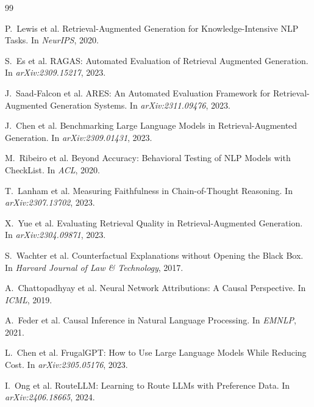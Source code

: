 \documentclass[11pt,a4paper]{article}
\begin{document}

\begin{thebibliography}{99}

P.~Lewis et al.
\newblock Retrieval-Augmented Generation for Knowledge-Intensive NLP Tasks.
\newblock In \emph{NeurIPS}, 2020.

S.~Es et al.
\newblock RAGAS: Automated Evaluation of Retrieval Augmented Generation.
\newblock In \emph{arXiv:2309.15217}, 2023.

J.~Saad-Falcon et al.
\newblock ARES: An Automated Evaluation Framework for Retrieval-Augmented Generation Systems.
\newblock In \emph{arXiv:2311.09476}, 2023.

J.~Chen et al.
\newblock Benchmarking Large Language Models in Retrieval-Augmented Generation.
\newblock In \emph{arXiv:2309.01431}, 2023.

M.~Ribeiro et al.
\newblock Beyond Accuracy: Behavioral Testing of NLP Models with CheckList.
\newblock In \emph{ACL}, 2020.

T.~Lanham et al.
\newblock Measuring Faithfulness in Chain-of-Thought Reasoning.
\newblock In \emph{arXiv:2307.13702}, 2023.

X.~Yue et al.
\newblock Evaluating Retrieval Quality in Retrieval-Augmented Generation.
\newblock In \emph{arXiv:2304.09871}, 2023.

S.~Wachter et al.
\newblock Counterfactual Explanations without Opening the Black Box.
\newblock In \emph{Harvard Journal of Law \& Technology}, 2017.

A.~Chattopadhyay et al.
\newblock Neural Network Attributions: A Causal Perspective.
\newblock In \emph{ICML}, 2019.

A.~Feder et al.
\newblock Causal Inference in Natural Language Processing.
\newblock In \emph{EMNLP}, 2021.

L.~Chen et al.
\newblock FrugalGPT: How to Use Large Language Models While Reducing Cost.
\newblock In \emph{arXiv:2305.05176}, 2023.

I.~Ong et al.
\newblock RouteLLM: Learning to Route LLMs with Preference Data.
\newblock In \emph{arXiv:2406.18665}, 2024.

\end{thebibliography}
\end{document}

